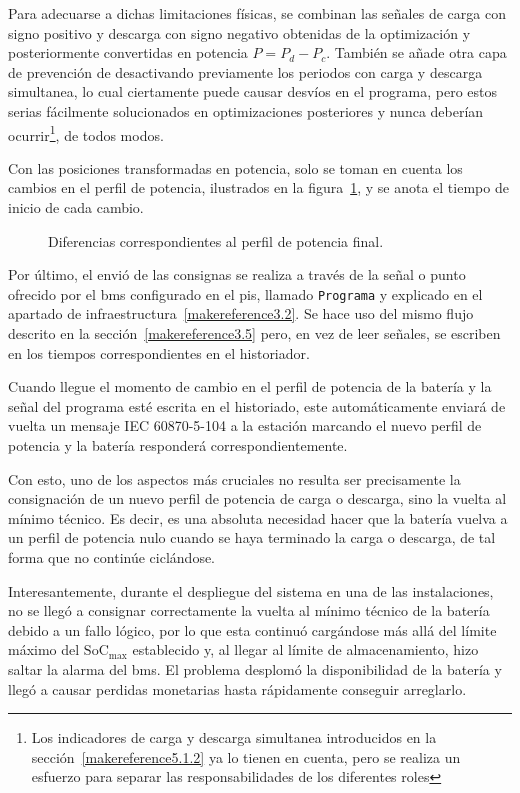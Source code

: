 Para adecuarse a dichas limitaciones físicas, se combinan las señales de carga con signo positivo y descarga con signo negativo obtenidas de la optimización y posteriormente convertidas en potencia \( P = P_{d} - P_{c} \). También se añade otra capa de prevención de desactivando previamente los periodos con carga y descarga simultanea, lo cual ciertamente puede causar desvíos en el programa, pero estos serias fácilmente solucionados en optimizaciones posteriores y nunca deberían ocurrir\footnote{Los indicadores de carga y descarga simultanea introducidos en la sección~\ref{makereference5.1.2} ya lo tienen en cuenta, pero se realiza un esfuerzo para separar las responsabilidades de los diferentes roles}, de todos modos.

Con las posiciones transformadas en potencia, solo se toman en cuenta los cambios en el perfil de potencia, ilustrados en la figura~\ref{fig:diferencia-perfil-potencia}, y se anota el tiempo de inicio de cada cambio.

\begin{figure}
  \centering
  \caption{Diferencias correspondientes al perfil de potencia final.}
  \label{fig:diferencia-perfil-potencia}
\end{figure}

Por último, el envió de las consignas se realiza a través de la señal o punto ofrecido por el \gls{bms} configurado en el \gls{pis}, llamado \texttt{Programa} y explicado en el apartado de infraestructura~\ref{makereference3.2}. Se hace uso del mismo flujo descrito en la sección~\ref{makereference3.5} pero, en vez de leer señales, se escriben en los tiempos correspondientes en el historiador.

Cuando llegue el momento de cambio en el perfil de potencia de la batería y la señal del programa esté escrita en el historiado, este automáticamente enviará de vuelta un mensaje IEC 60870-5-104 a la estación marcando el nuevo perfil de potencia y la batería responderá correspondientemente.

Con esto, uno de los aspectos más cruciales no resulta ser precisamente la consignación de un nuevo perfil de potencia de carga o descarga, sino la vuelta al mínimo técnico. Es decir, es una absoluta necesidad hacer que la batería vuelva a un perfil de potencia nulo cuando se haya terminado la carga o descarga, de tal forma que no continúe ciclándose.

Interesantemente, durante el despliegue del sistema en una de las instalaciones, no se llegó a consignar correctamente la vuelta al mínimo técnico de la batería debido a un fallo lógico, por lo que esta continuó cargándose más allá del límite máximo del \( \mathrm{SoC}_{\text{max}} \) establecido y, al llegar al límite de almacenamiento, hizo saltar la alarma del \gls{bms}. El problema desplomó la disponibilidad de la batería y llegó a causar perdidas monetarias hasta rápidamente conseguir arreglarlo.


